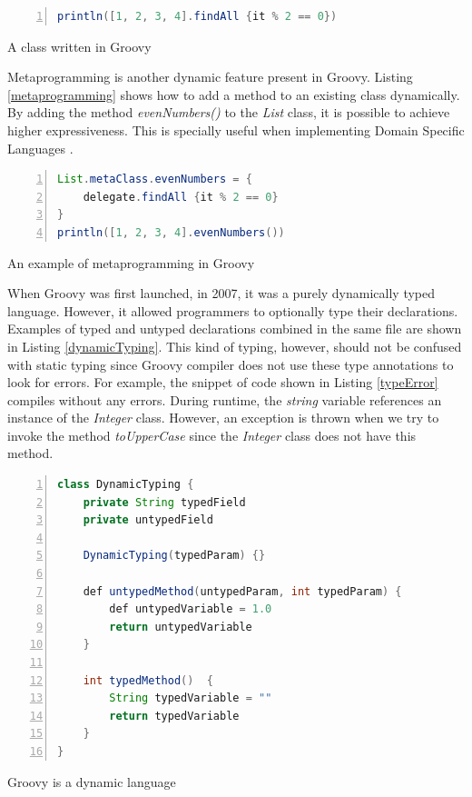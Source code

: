 \documentclass[preprint]{sigplanconf}
\begin{document}
\begin{Listing}[ht]
\begin{lstlisting}[language=Java,tabsize=2,breaklines=true,numbers=left]
println([1, 2, 3, 4].findAll {it % 2 == 0})
\end{lstlisting}
\caption{A class written in Groovy}
\label{dynamicInfuence}
\end{Listing}

Metaprogramming is another dynamic feature present in Groovy. 
Listing \ref{metaprogramming} shows how to add a method to an existing class dynamically.
By adding the method \emph{evenNumbers()} to the \emph{List} class, it is possible to achieve higher expressiveness.
This is specially useful when implementing Domain Specific Languages \cite{fowler10}.

\begin{Listing}[ht]
\begin{lstlisting}[language=Java,tabsize=2,breaklines=true,numbers=left]
List.metaClass.evenNumbers = {
	delegate.findAll {it % 2 == 0}
}
println([1, 2, 3, 4].evenNumbers())

\end{lstlisting}
\caption{An example of metaprogramming in Groovy}
\label{metaprogramming}
\end{Listing}

When Groovy was first launched, in 2007, it was a purely dynamically typed language.
However, it allowed programmers to optionally type their declarations.
Examples of typed and untyped declarations combined in the same file are shown in Listing \ref{dynamicTyping}.
This kind of typing, however, should not be confused with static typing since Groovy compiler does not use these type annotations to look for errors.
For example, the snippet of code shown in Listing \ref{typeError} compiles without any errors.
During runtime, the \emph{string} variable references an instance of the \emph{Integer} class.
However, an exception is thrown when we try to invoke the method \emph{toUpperCase} since the \emph{Integer} class does not have this method.

\begin{Listing}[ht]
\begin{lstlisting}[language=Java,tabsize=2,breaklines=true,numbers=left]
class DynamicTyping {
	private String typedField
	private untypedField

	DynamicTyping(typedParam) {}

	def untypedMethod(untypedParam, int typedParam) {
		def untypedVariable = 1.0
		return untypedVariable
	}

	int typedMethod()  {
		String typedVariable = ""
		return typedVariable
	}
}
\end{lstlisting}
\caption{Groovy is a dynamic language}
\label{dynamicTyping}
\end{Listing}
\end{document}
